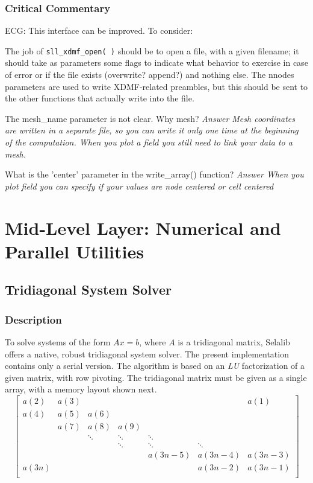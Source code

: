 \documentclass[]{report}   %
\begin{document}
\subsection{Critical Commentary}
ECG: This interface can be improved. To consider:
\begin{description}
\item The job of \verb+sll_xdmf_open( )+ should be to open a file, with a given filename; it should take as parameters some flags to indicate what behavior to exercise in case of error or if the file exists (overwrite? append?) and nothing else. The nnodes parameters are used to write XDMF-related preambles, but this should be sent to the other functions that actually write into the file.
\item The mesh\_name parameter is not clear. Why mesh?
{\it Answer Mesh coordinates are written in a separate file, so you can write it only one time at the beginning of the computation. When you plot a field you still need to link your data to a mesh.}
\item What is the 'center' parameter in the write\_array() function?
{\it Answer When you plot field you can specify if your values are node centered or cell centered}
\end{description}

\chapter{Mid-Level Layer: Numerical and Parallel Utilities}

\section{Tridiagonal System Solver}
\subsection{Description}
To solve systems of the form $Ax=b$, where $A$ is a tridiagonal matrix, Selalib offers a native, robust tridiagonal system solver. The present implementation contains only a serial version. The algorithm is based on an \emph{LU} factorization of a given matrix, with row pivoting. The tridiagonal matrix must be given as a single array, with a memory layout shown next.
\begin{equation*}
  \begin{bmatrix}
    a(2) & a(3) &        &        &        &        &  a(1) \\
    a(4) & a(5) & a(6)   &        &        &        &       \\
         & a(7) & a(8)   & a(9)   &        &        &       \\
         &      & \ddots & \ddots & \ddots &        &       \\
         &      &        & \ddots & \ddots & \ddots &       \\
         &      &        &        & a(3n-5)& a(3n-4)&a(3n-3)\\
    a(3n)&      &        &        &        & a(3n-2)&a(3n-1)\\
  \end{bmatrix}
\end{equation*}
\end{document}

